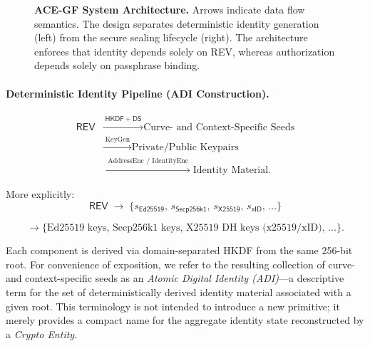 \documentclass[12pt,a4paper]{article}
\begin{document}
\begin{figure}[!ht]
{%
   }
   \caption{\textbf{ACE-GF System Architecture.} Arrows indicate data flow semantics. The design separates deterministic identity generation (left) from the secure sealing lifecycle (right). The architecture enforces that identity depends solely on REV, whereas authorization depends solely on passphrase binding.}
   \label{fig:architecture}
  \end{figure}

  \paragraph{Deterministic Identity Pipeline (ADI Construction).}
  \begin{align*}
   \mathsf{REV}
   &\xrightarrow{\;\mathsf{HKDF+DS}\;}
   \text{Curve- and Context-Specific Seeds} \\
   &\xrightarrow{\;\text{KeyGen}\;}
   \text{Private/Public Keypairs} \\
   &\xrightarrow{\;\text{AddressEnc / IdentityEnc}\;}
   \text{Identity Material}.
  \end{align*}

  More explicitly:
  \[
   \mathsf{REV}
   \;\longrightarrow\;
   \{
   s_{\mathsf{Ed25519}},\,
   s_{\mathsf{Secp256k1}},\,
   s_{\mathsf{X25519}},\,
   s_{\mathsf{xID}},\,
   \ldots
   \}
  \]

  \[
   \longrightarrow
   \{
   \text{Ed25519 keys},\,
   \text{Secp256k1 keys},\,
   \text{X25519 DH keys (x25519/xID)},\,
   \ldots
   \}.
  \]

  Each component is derived via domain-separated HKDF from the same
  256-bit root. For convenience of exposition, we refer to the resulting
  collection of curve- and context-specific seeds as an \emph{Atomic Digital
  Identity (ADI)}---a descriptive term for the set of deterministically
  derived identity material associated with a given root. This terminology
  is not intended to introduce a new primitive; it merely provides a compact
  name for the aggregate identity state reconstructed by a \emph{Crypto Entity}.
\end{document}
